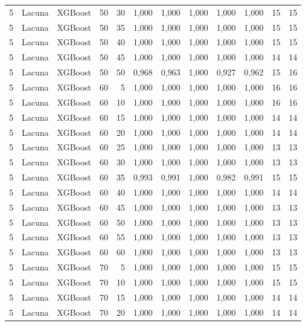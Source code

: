 \begin{longtable}{@{}rllrrrrrrrrr@{}}
5 & Lacuna & XGBoost & 50 & 30 & 1,000 & 1,000 & 1,000 & 1,000 & 1,000 & 15 & 15 \\
5 & Lacuna & XGBoost & 50 & 35 & 1,000 & 1,000 & 1,000 & 1,000 & 1,000 & 15 & 15 \\
5 & Lacuna & XGBoost & 50 & 40 & 1,000 & 1,000 & 1,000 & 1,000 & 1,000 & 15 & 15 \\
5 & Lacuna & XGBoost & 50 & 45 & 1,000 & 1,000 & 1,000 & 1,000 & 1,000 & 14 & 14 \\
5 & Lacuna & XGBoost & 50 & 50 & 0,968 & 0,963 & 1,000 & 0,927 & 0,962 & 15 & 16 \\
5 & Lacuna & XGBoost & 60 & 5 & 1,000 & 1,000 & 1,000 & 1,000 & 1,000 & 16 & 16 \\
5 & Lacuna & XGBoost & 60 & 10 & 1,000 & 1,000 & 1,000 & 1,000 & 1,000 & 16 & 16 \\
5 & Lacuna & XGBoost & 60 & 15 & 1,000 & 1,000 & 1,000 & 1,000 & 1,000 & 14 & 14 \\
5 & Lacuna & XGBoost & 60 & 20 & 1,000 & 1,000 & 1,000 & 1,000 & 1,000 & 14 & 14 \\
5 & Lacuna & XGBoost & 60 & 25 & 1,000 & 1,000 & 1,000 & 1,000 & 1,000 & 13 & 13 \\
5 & Lacuna & XGBoost & 60 & 30 & 1,000 & 1,000 & 1,000 & 1,000 & 1,000 & 13 & 13 \\
5 & Lacuna & XGBoost & 60 & 35 & 0,993 & 0,991 & 1,000 & 0,982 & 0,991 & 15 & 15 \\
5 & Lacuna & XGBoost & 60 & 40 & 1,000 & 1,000 & 1,000 & 1,000 & 1,000 & 14 & 14 \\
5 & Lacuna & XGBoost & 60 & 45 & 1,000 & 1,000 & 1,000 & 1,000 & 1,000 & 13 & 13 \\
5 & Lacuna & XGBoost & 60 & 50 & 1,000 & 1,000 & 1,000 & 1,000 & 1,000 & 13 & 13 \\
5 & Lacuna & XGBoost & 60 & 55 & 1,000 & 1,000 & 1,000 & 1,000 & 1,000 & 13 & 13 \\
5 & Lacuna & XGBoost & 60 & 60 & 1,000 & 1,000 & 1,000 & 1,000 & 1,000 & 13 & 13 \\
5 & Lacuna & XGBoost & 70 & 5 & 1,000 & 1,000 & 1,000 & 1,000 & 1,000 & 15 & 15 \\
5 & Lacuna & XGBoost & 70 & 10 & 1,000 & 1,000 & 1,000 & 1,000 & 1,000 & 15 & 15 \\
5 & Lacuna & XGBoost & 70 & 15 & 1,000 & 1,000 & 1,000 & 1,000 & 1,000 & 14 & 14 \\
5 & Lacuna & XGBoost & 70 & 20 & 1,000 & 1,000 & 1,000 & 1,000 & 1,000 & 14 & 14 \\

\end{longtable}
